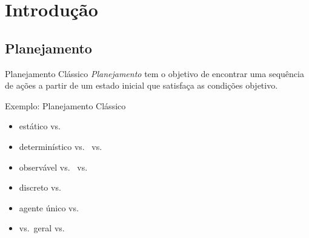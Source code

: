 \documentclass{beamer}
\begin{document}
\section{Introdução}

\subsection{Planejamento}
\begin{frame}{Planejamento Clássico}
\emph{Planejamento} tem o objetivo de encontrar uma \alert{sequência de ações} a partir de um \alert{estado inicial} que satisfaça as \alert{condições objetivo}.
    \begin{exampleblock}{\strut Exemplo: Planejamento Clássico}
      \begin{itemize}
      \item \alert{estático} vs.\ 
        \pause
      \item \alert{determinístico} vs.\ 
        vs.\ 
        \pause
      \item \alert{observável}
        vs.\ 
        vs.\ 
        \pause
      \item \alert{discreto} vs.\ 
        \pause
      \item \alert{agente único} vs.\ 
      \end{itemize}

      \pause
      \begin{itemize}
      \item {} vs.\ \alert{geral} vs.\ 
      \end{itemize}
    \end{exampleblock}
\end{frame}
\end{document}
